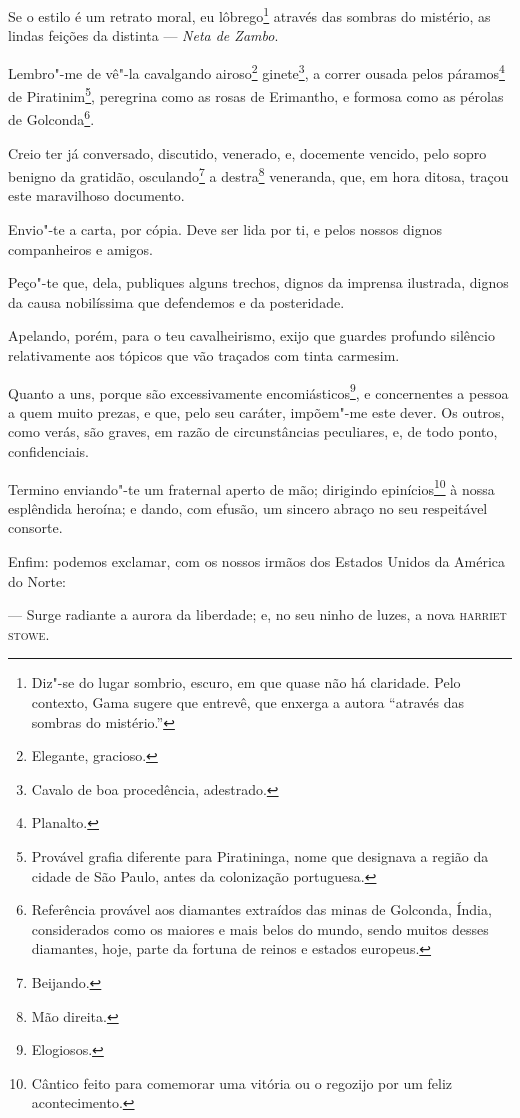 Se o estilo é um retrato moral, eu lôbrego\footnote{Diz"-se do lugar
  sombrio, escuro, em que quase não há claridade. Pelo contexto, Gama
  sugere que entrevê, que enxerga a autora ``através das sombras do
  mistério.''} através das sombras do mistério, as lindas feições da
distinta --- \emph{Neta de Zambo}.

Lembro"-me de vê"-la cavalgando airoso\footnote{Elegante, gracioso.}
ginete\footnote{Cavalo de boa procedência, adestrado.}, a correr
ousada pelos páramos\footnote{Planalto.} de Piratinim\footnote{
  Provável grafia diferente para Piratininga, nome que designava a
  região da cidade de São Paulo, antes da colonização portuguesa.},
peregrina como as rosas de Erimantho, e formosa como as pérolas de
Golconda\footnote{Referência provável aos diamantes extraídos das
  minas de Golconda, Índia, considerados como os maiores e mais belos do
  mundo, sendo muitos desses diamantes, hoje, parte da fortuna de reinos
  e estados europeus.}.

Creio ter já conversado, discutido, venerado, e, docemente vencido, pelo
sopro benigno da gratidão, osculando\footnote{Beijando.} a
destra\footnote{Mão direita.} veneranda, que, em hora ditosa, traçou
este maravilhoso documento.

Envio"-te a carta, por cópia. Deve ser lida por ti, e pelos nossos dignos
companheiros e amigos.

Peço"-te que, dela, publiques alguns trechos, dignos da imprensa
ilustrada, dignos da causa nobilíssima que defendemos e da posteridade.

Apelando, porém, para o teu cavalheirismo, exijo que guardes profundo
silêncio relativamente aos tópicos que vão traçados com tinta carmesim.

Quanto a uns, porque são excessivamente encomiásticos\footnote{
  Elogiosos.}, e concernentes a pessoa a quem muito prezas, e que, pelo
seu caráter, impõem"-me este dever. Os outros, como verás, são graves, em
razão de circunstâncias peculiares, e, de todo ponto, confidenciais.

Termino enviando"-te um fraternal aperto de mão; dirigindo
epinícios\footnote{Cântico feito para comemorar uma vitória ou o
  regozijo por um feliz acontecimento.} à nossa esplêndida heroína; e
dando, com efusão, um sincero abraço no seu respeitável consorte.

Enfim: podemos exclamar, com os nossos irmãos dos Estados Unidos da
América do Norte:

--- Surge radiante a aurora da liberdade; e, no seu ninho de luzes, a
nova \textsc{harriet stowe}.

